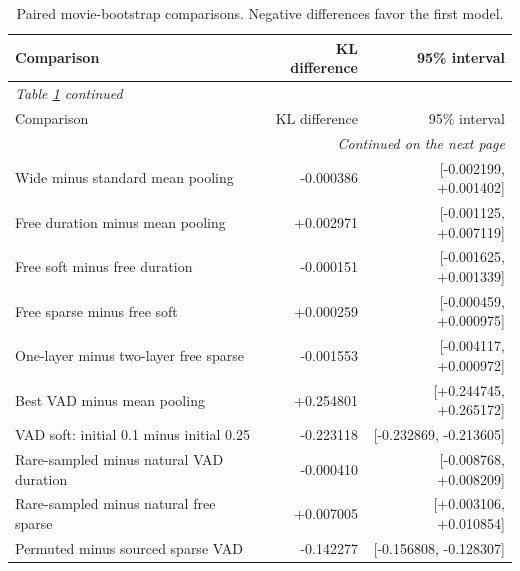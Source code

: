 \begingroup
\small
\setlength{\tabcolsep}{4pt}
\begin{longtable}{p{8.8cm}rr}
\caption{Paired movie-bootstrap comparisons. Negative differences favor the first model.}\label{tab:paired}\\
\toprule
Comparison & KL difference & 95\% interval \\
\midrule\endfirsthead
\multicolumn{3}{l}{\textit{Table \ref{tab:paired} continued}}\\
\toprule
Comparison & KL difference & 95\% interval \\
\midrule\endhead
\midrule\multicolumn{3}{r}{\textit{Continued on the next page}}\\\endfoot
\bottomrule\endlastfoot
Wide minus standard mean pooling & -0.000386 & [-0.002199, +0.001402] \\
Free duration minus mean pooling & +0.002971 & [-0.001125, +0.007119] \\
Free soft minus free duration & -0.000151 & [-0.001625, +0.001339] \\
Free sparse minus free soft & +0.000259 & [-0.000459, +0.000975] \\
One-layer minus two-layer free sparse & -0.001553 & [-0.004117, +0.000972] \\
Best VAD minus mean pooling & +0.254801 & [+0.244745, +0.265172] \\
VAD soft: initial 0.1 minus initial 0.25 & -0.223118 & [-0.232869, -0.213605] \\
Rare-sampled minus natural VAD duration & -0.000410 & [-0.008768, +0.008209] \\
Rare-sampled minus natural free sparse & +0.007005 & [+0.003106, +0.010854] \\
Permuted minus sourced sparse VAD & -0.142277 & [-0.156808, -0.128307] \\
\end{longtable}
\endgroup
